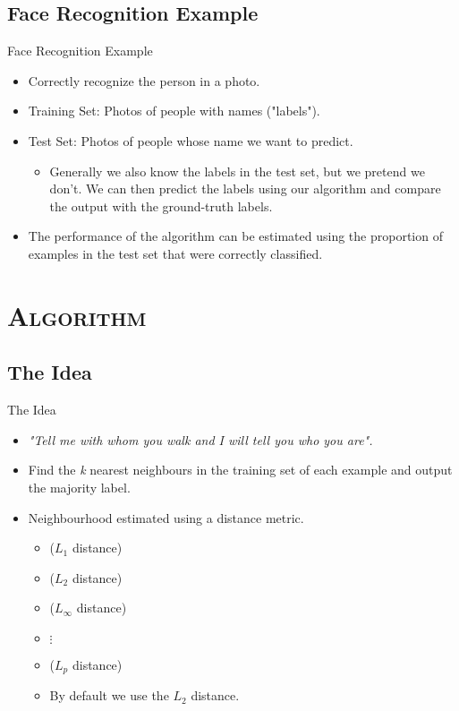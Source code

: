 \documentclass[xcolor=x11names,compress]{beamer}
\renewcommand{\(}{\begin{columns}}
\renewcommand{\)}{\end{columns}}
\newcommand{\<}[1]{\begin{column}{#1}}
\renewcommand{\>}{\end{column}}
\begin{document}
\subsection{Face Recognition Example}
\begin{frame}{Face Recognition Example}
	\begin{itemize}
		\item Correctly recognize the person in a photo.
		\item Training Set: Photos of people with names ("labels").
		\item Test Set: Photos of people whose name we want to predict.
		\begin{itemize}
			\item Generally we also know the labels in the test set, but we pretend we don't. We can then predict the labels using our algorithm and compare the output with the ground-truth labels.
		\end{itemize}
		\item The performance of the algorithm can be estimated using the proportion of examples in the test set that were correctly classified.
	\end{itemize}
\end{frame}


\section{\scshape Algorithm}
\subsection{The Idea}
\begin{frame}{The Idea}
	\begin{itemize}
		\item \textit{"Tell me with whom you walk and I will tell you who you are".}
		\item Find the \textit{k} nearest neighbours in the training set of each example and output the majority label.
		\item Neighbourhood estimated using a distance metric.
		\begin{itemize}
			\item {} ($L_1$ distance)
			\item {} ($L_2$ distance)
			\item {} ($L_\infty$ distance)
			\item $\vdots$
			\item {} ($L_p$ distance)
			\item By default we use the $L_2$ distance.
		\end{itemize}
	\end{itemize}
\end{frame}
\end{document}
